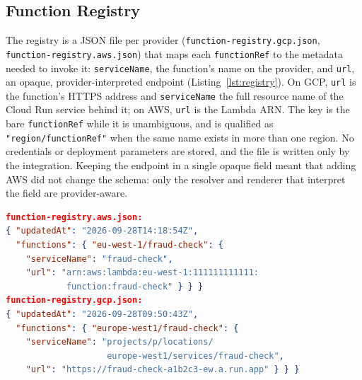\documentclass[conference]{IEEEtran}
\begin{document}
\subsection{Function Registry}
The registry is a JSON file per provider (\texttt{function-registry.gcp.json},
\texttt{function-registry.aws.json}) that maps each \texttt{functionRef} to the metadata needed to
invoke it: \texttt{serviceName}, the function's name on the provider, and \texttt{url}, an opaque,
provider-interpreted endpoint (Listing~\ref{lst:registry}). On GCP, \texttt{url} is the function's
HTTPS address and \texttt{serviceName} the full resource name of the Cloud Run service behind it;
on AWS, \texttt{url} is the Lambda ARN. The key is the bare \texttt{functionRef} while it is
unambiguous, and is qualified as \texttt{"region/functionRef"} when the same name exists in more
than one region. No credentials or deployment parameters are stored, and the file is written only
by the integration. Keeping the endpoint in a single opaque field meant that adding AWS did not
change the schema: only the resolver and renderer that interpret the field are provider-aware.

\begin{lstlisting}[language=json,caption={Registry entries on each provider (abridged).},label={lst:registry}]
function-registry.aws.json:
{ "updatedAt": "2026-09-28T14:18:54Z",
  "functions": { "eu-west-1/fraud-check": {
    "serviceName": "fraud-check",
    "url": "arn:aws:lambda:eu-west-1:111111111111:
            function:fraud-check" } } }
function-registry.gcp.json:
{ "updatedAt": "2026-09-28T09:50:43Z",
  "functions": { "europe-west1/fraud-check": {
    "serviceName": "projects/p/locations/
                    europe-west1/services/fraud-check",
    "url": "https://fraud-check-a1b2c3-ew.a.run.app" } } }
\end{lstlisting}
\end{document}
